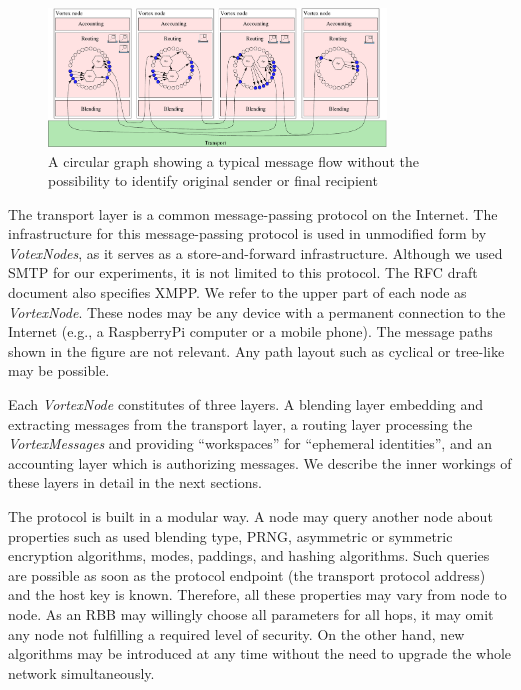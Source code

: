 \documentclass[acmsmall, screen, review]{acmart}
\begin{document}
	\begin{figure}[ht]
		\centering\includegraphics[width=0.8\textwidth]{roughProtocolDesign}
		\caption{A circular graph showing a typical message flow without the possibility to identify original sender or final recipient}
		\label{fig:protocolLayers}
	\end{figure}
	
	The transport layer is a common message-passing protocol on the Internet. The infrastructure for this message-passing protocol is used in unmodified form by \emph{VotexNodes}, as it serves as a store-and-forward infrastructure. Although we used SMTP for our experiments, it is not limited to this protocol. The RFC draft document also specifies XMPP. We refer to the upper part of each node as \emph{VortexNode}. These nodes may be any device with a permanent connection to the Internet (e.g., a RaspberryPi computer or a mobile phone). The message paths shown in the figure are not relevant. Any path layout such as cyclical or tree-like may be possible.
	
	Each \emph{VortexNode} constitutes of three layers. A blending layer embedding and extracting messages from the transport layer, a routing layer processing the \emph{VortexMessages} and providing ``workspaces'' for ``ephemeral identities'', and an accounting layer which is authorizing messages. We describe the inner workings of these layers in detail in the next sections.
	
	The protocol is built in a modular way. A node may query another node about properties such as used blending type, PRNG, asymmetric or symmetric encryption algorithms, modes, paddings, and hashing algorithms. Such queries are possible as soon as the protocol endpoint (the transport protocol address) and the host key is known. Therefore, all these properties may vary from node to node. As an RBB may willingly choose all parameters for all hops, it may omit any node not fulfilling a required level of security. On the other hand, new algorithms may be introduced at any time without the need to upgrade the whole network simultaneously. 
	
\end{document}
